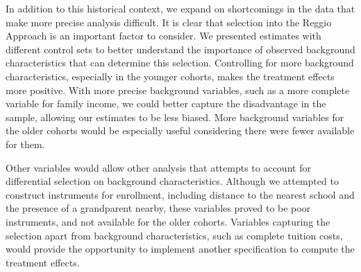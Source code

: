 
In addition to this historical context, we expand on shortcomings in the data that make more precise analysis difficult. It is clear that selection into the Reggio Approach is an important factor to consider. We presented estimates with different control sets to better understand the importance of observed background characteristics that can determine this selection. Controlling for more background characteristics, especially in the younger cohorts, makes the treatment effects more positive. With more precise background variables, such as a more complete variable for family income, we could better capture the disadvantage in the sample, allowing our estimates to be less biased. More background variables for the older cohorts would be especially useful considering there were fewer available for them.


Other variables would allow other analysis that attempts to account for differential selection on background characteristics. Although we attempted to construct instruments for enrollment, including distance to the nearest school and the presence of a grandparent nearby, these variables proved to be poor instruments, and not available for the older cohorts. Variables capturing the selection apart from background characteristics, such as complete tuition costs, would provide the opportunity to implement another specification to compute the treatment effects.



